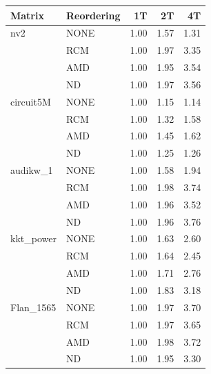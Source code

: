 \begin{table}[htbp]
  \centering
  \label{tab:scaling_x86}
  \begin{tabular}{llrrr}
    \toprule
    \textbf{Matrix} & \textbf{Reordering} & \textbf{1T} & \textbf{2T} & \textbf{4T} \\
    \midrule
    nv2 & NONE & 1.00 & 1.57 & 1.31 \\
     & RCM & 1.00 & 1.97 & 3.35 \\
     & AMD & 1.00 & 1.95 & 3.54 \\
     & ND & 1.00 & 1.97 & 3.56 \\
    \midrule
    circuit5M & NONE & 1.00 & 1.15 & 1.14 \\
     & RCM & 1.00 & 1.32 & 1.58 \\
     & AMD & 1.00 & 1.45 & 1.62 \\
     & ND & 1.00 & 1.25 & 1.26 \\
    \midrule
    audikw\_1 & NONE & 1.00 & 1.58 & 1.94 \\
     & RCM & 1.00 & 1.98 & 3.74 \\
     & AMD & 1.00 & 1.96 & 3.52 \\
     & ND & 1.00 & 1.96 & 3.76 \\
    \midrule
    kkt\_power & NONE & 1.00 & 1.63 & 2.60 \\
     & RCM & 1.00 & 1.64 & 2.45 \\
     & AMD & 1.00 & 1.71 & 2.76 \\
     & ND & 1.00 & 1.83 & 3.18 \\
    \midrule
    Flan\_1565 & NONE & 1.00 & 1.97 & 3.70 \\
     & RCM & 1.00 & 1.97 & 3.65 \\
     & AMD & 1.00 & 1.98 & 3.72 \\
     & ND & 1.00 & 1.95 & 3.30 \\
    \bottomrule
  \end{tabular}
\end{table}